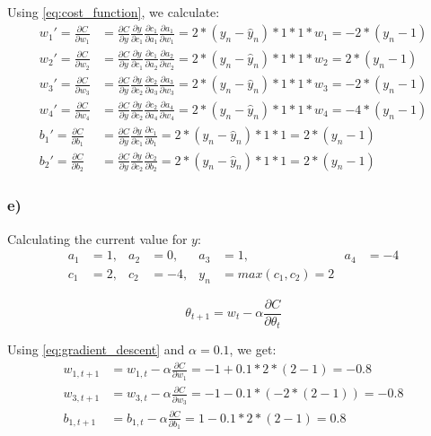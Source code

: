 Using \cref{eq:cost_function}, we calculate: 
\begin{align*}
        w_1' = \frac{ \partial C}{\partial w_1} 
    &= \frac{\partial C}{\partial y} \frac{\partial y}{\partial c_1} 
    \frac{\partial c_1}{\partial a_1} \frac{\partial a_1}{\partial w_1}
    = 2 * (y_n - \hat{y}_n) * 1 * 1 * w_1 = - 2 * (y_n - 1) \\
        w_2' = \frac{\partial C}{\partial w_2} 
    &= \frac{\partial C}{\partial y} \frac{\partial y}{\partial c_1} 
    \frac{\partial c_1}{\partial a_2} \frac{\partial a_2}{\partial w_2}
    = 2 * (y_n - \hat{y}_n) * 1 * 1 * w_2 = 2 * (y_n - 1) \\
        w_3' = \frac{\partial C}{\partial w_3} 
    &= \frac{\partial C}{\partial y} \frac{\partial y}{\partial c_2} 
    \frac{\partial c_2}{\partial a_3} \frac{\partial a_3}{\partial w_3}
    = 2 * (y_n - \hat{y}_n) * 1 * 1 * w_3 = - 2 * (y_n - 1) \\
        w_4' = \frac{\partial C}{\partial w_4} 
    &= \frac{\partial C}{\partial y} \frac{\partial y}{\partial c_2} 
    \frac{\partial c_2}{\partial a_4} \frac{\partial a_4}{\partial w_4}
    = 2 * (y_n - \hat{y}_n) * 1 * 1 * w_4 = - 4 * (y_n - 1) \\
        b_1' = \frac{\partial C}{\partial b_1} 
    &= \frac{\partial C}{\partial y} \frac{\partial y}{\partial c_1} 
    \frac{\partial c_1}{\partial b_1} 
    = 2 * (y_n - \hat{y}_n) * 1 * 1 = 2 * (y_n - 1) \\ 
        b_2' = \frac{\partial C}{\partial b_2}
    &= \frac{\partial C}{\partial y} \frac{\partial y}{\partial c_2} 
    \frac{\partial c_2}{\partial b_2} 
    = 2 * (y_n - \hat{y}_n) * 1 * 1 = 2 * (y_n - 1) 
\end{align*}

\subsubsection*{e)}
Calculating the current value for $y$: 
\begin{align*}
    a_1 &= 1,& a_2 &= 0,& a_3 &= 1,& a_4 &= -4 \\
    c_1 &= 2,& c_2 &= -4,& y_n  &= max(c_1, c_2) = 2
\end{align*}

\begin{equation}
    \label{eq:gradient_descent}
    \theta_{t+1} = w_t - \alpha \frac{\partial C}{\partial \theta_t}
\end{equation}

Using \cref{eq:gradient_descent} and $\alpha = 0.1$, we get: 
\begin{align*}
    w_{1, t + 1} 
    &= w_{1, t} - \alpha \frac{ \partial C}{\partial w_1} 
     = -1 + 0.1 * 2 * (2 - 1) = - 0.8 \\
    w_{3, t + 1} 
    &= w_{3, t} - \alpha \frac{ \partial C}{\partial w_3} 
     = -1 - 0.1 * (- 2 * (2 - 1)) = - 0.8 \\
    b_{1, t + 1} 
    &= b_{1, t} - \alpha \frac{ \partial C}{\partial b_1} 
     = 1 - 0.1 * 2 * (2 - 1) = 0.8
\end{align*}

